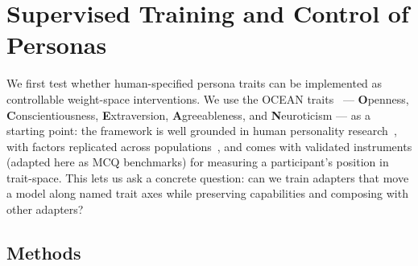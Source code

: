 \section{Supervised Training and Control of Personas}\label{sec:supervised}

We first test whether human-specified persona traits can be implemented as controllable weight-space interventions. We use the OCEAN traits~\citep{mccrae1992introduction} --- \textbf{O}penness, \textbf{C}onscientiousness, \textbf{E}xtraversion, \textbf{A}greeableness, and \textbf{N}euroticism --- as a starting point: the framework is well grounded in human personality research~\citep{john2008paradigm,marsh2010new,saucier1999hierarchical}, with factors replicated across populations~\citep{rolland2002cross}, and comes with validated instruments (adapted here as MCQ benchmarks) for measuring a participant’s position in trait-space. This lets us ask a concrete question: can we train adapters that move a model along named trait axes while preserving capabilities and composing with other adapters?

\subsection{Methods}\label{sec:methods}

